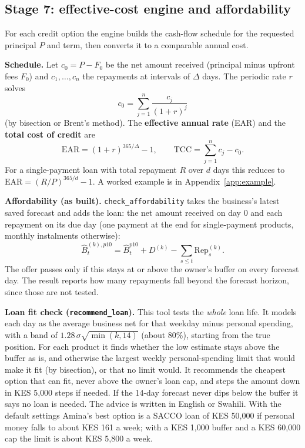 \documentclass[10pt,a4paper]{article}
\newcommand{\code}[1]{\texttt{\small #1}}
\begin{document}
\subsection{Stage 7: effective-cost engine and affordability}
For each credit option the engine builds the cash-flow schedule for the requested principal $P$ and term, then converts it to a comparable annual cost.

\textbf{Schedule.} Let $c_0 = P - F_0$ be the net amount received (principal minus upfront fees $F_0$) and $c_1,\dots,c_n$ the repayments at intervals of $\Delta$ days. The periodic rate $r$ solves
\[
c_0=\sum_{j=1}^{n}\frac{c_j}{(1+r)^{j}}
\]
(by bisection or Brent's method). The \textbf{effective annual rate} (EAR) and the \textbf{total cost of credit} are
\[
\text{EAR}=(1+r)^{365/\Delta}-1,\qquad
\text{TCC}=\sum_{j=1}^{n}c_j-c_0 .
\]
For a single-payment loan with total repayment $R$ over $d$ days this reduces to $\text{EAR}=(R/P)^{365/d}-1$. A worked example is in Appendix~\ref{app:example}.

\textbf{Affordability (as built).} \code{check\_affordability} takes the business's latest saved forecast and adds the loan: the net amount received on day 0 and each repayment on its due day (one payment at the end for single-payment products, monthly instalments otherwise):
\[
\hat B^{(k),p10}_t=\hat B^{p10}_t + D^{(k)} - \sum_{s\le t}\text{Rep}^{(k)}_s .
\]
The offer passes only if this stays at or above the owner's buffer on every forecast day. The result reports how many repayments fall beyond the forecast horizon, since those are not tested.

\textbf{Loan fit check (\code{recommend\_loan}).} This tool tests the \emph{whole} loan life. It models each day as the average business net for that weekday minus personal spending, with a band of $1.28\,\sigma\sqrt{\min(k,14)}$ (about 80\%), starting from the true position. For each product it finds whether the low estimate stays above the buffer as is, and otherwise the largest weekly personal-spending limit that would make it fit (by bisection), or that no limit would. It recommends the cheapest option that can fit, never above the owner's loan cap, and steps the amount down in KES 5{,}000 steps if needed. If the 14-day forecast never dips below the buffer it says no loan is needed. The advice is written in English or Swahili. With the default settings Amina's best option is a SACCO loan of KES 50{,}000 if personal money falls to about KES 161 a week; with a KES 1{,}000 buffer and a KES 60{,}000 cap the limit is about KES 5{,}800 a week.
\end{document}
